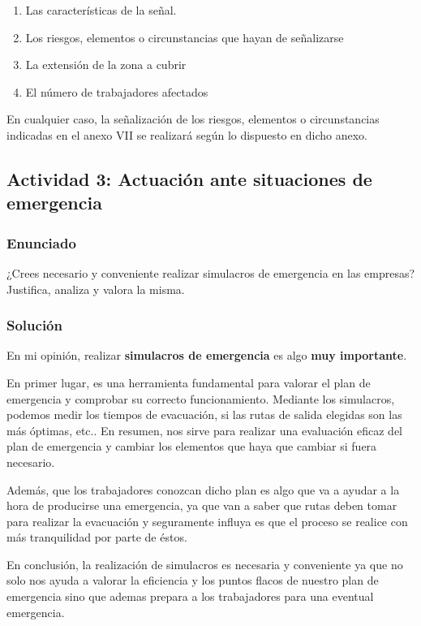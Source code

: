 \begin{enumerate}[label=\alph*.]
    \begin{enumerate}[label=\alph*.]
        \item Las características de la señal.
        \item Los riesgos, elementos o circunstancias que hayan de señalizarse
        \item La extensión de la zona a cubrir
        \item El número de trabajadores afectados
    \end{enumerate}

    En cualquier caso, la señalización de los riesgos, elementos o circunstancias indicadas en el anexo VII se realizará según lo dispuesto en dicho anexo.
\end{enumerate}

\subsection{Actividad 3: Actuación ante situaciones de emergencia}

\subsubsection{Enunciado}
¿Crees necesario y conveniente realizar simulacros de emergencia en las empresas? Justifica, analiza y valora la misma.

\subsubsection{Solución}
En mi opinión, realizar \textbf{simulacros de emergencia} es algo \textbf{muy importante}.

En primer lugar, es una herramienta fundamental para valorar el plan de emergencia y comprobar su correcto funcionamiento. Mediante los simulacros, podemos medir los tiempos de evacuación, si las rutas de salida elegidas son las más óptimas, etc.. En resumen, nos sirve para realizar una evaluación eficaz del plan de emergencia y cambiar los elementos que haya que cambiar si fuera necesario.

Además, que los trabajadores conozcan dicho plan es algo que va a ayudar a la hora de producirse una emergencia, ya que van a saber que rutas deben tomar para realizar la evacuación y seguramente influya es que el proceso se realice con más tranquilidad por parte de éstos.

En conclusión, la realización de simulacros es necesaria y conveniente ya que no solo nos ayuda a valorar la eficiencia y los puntos flacos de nuestro plan de emergencia sino que ademas prepara a los trabajadores para una eventual emergencia.


